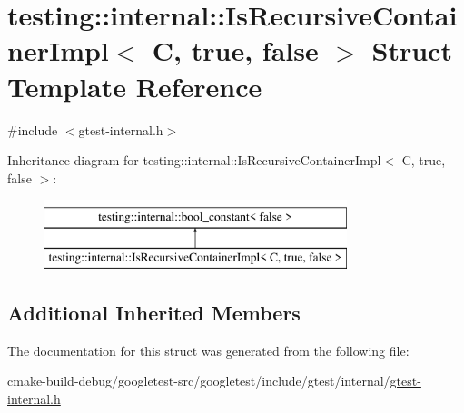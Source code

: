 \hypertarget{structtesting_1_1internal_1_1IsRecursiveContainerImpl_3_01C_00_01true_00_01false_01_4}{}\section{testing\+::internal\+::Is\+Recursive\+Container\+Impl$<$ C, true, false $>$ Struct Template Reference}
\label{structtesting_1_1internal_1_1IsRecursiveContainerImpl_3_01C_00_01true_00_01false_01_4}


{\ttfamily \#include $<$gtest-\/internal.\+h$>$}

Inheritance diagram for testing\+::internal\+::Is\+Recursive\+Container\+Impl$<$ C, true, false $>$\+:\begin{figure}[H]
\begin{center}
\leavevmode
\includegraphics[height=2.000000cm]{structtesting_1_1internal_1_1IsRecursiveContainerImpl_3_01C_00_01true_00_01false_01_4}
\end{center}
\end{figure}
\subsection*{Additional Inherited Members}


The documentation for this struct was generated from the following file\+:\begin{DoxyCompactItemize}
\item 
cmake-\/build-\/debug/googletest-\/src/googletest/include/gtest/internal/\mbox{\hyperlink{gtest-internal_8h}{gtest-\/internal.\+h}}\end{DoxyCompactItemize}
